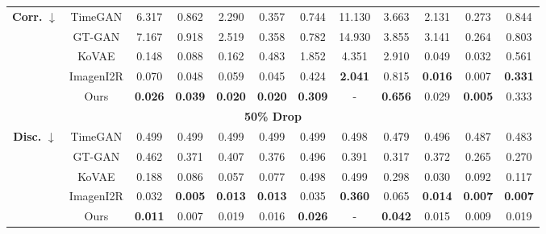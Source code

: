 \documentclass{article}
\theoremstyle{plain}
\theoremstyle{definition}
\theoremstyle{remark}
\begin{document}
\begin{table}[!t]
{\begin{tabular}{cc|cccccccccc}
    \multirow{5}{*}{\textbf{Corr.} $\downarrow$}
      & TimeGAN
         & 6.317
         & 0.862
         & 2.290
         & 0.357
         & 0.744
         & 11.130
         & 3.663
         & 2.131
         & 0.273
         & 0.844 \\
      & GT-GAN
         & 7.167
         & 0.918
         & 2.519
         & 0.358
         & 0.782
         & 14.930
         & 3.855
         & 3.141
         & 0.264
         & 0.803 \\
      & KoVAE
         & 0.148
         & 0.088
         & 0.162
         & 0.483
         & 1.852
         & 4.351
         & 2.910
         & 0.049
         & 0.032
         & 0.561 \\
      & ImagenI2R
         & 0.070
         & 0.048
         & 0.059
         & 0.045
         & 0.424
         & \textbf{2.041}
         & 0.815
         & \textbf{0.016}
         & 0.007
         & \textbf{0.331} \\
    & Ours
       & \textbf{0.026} & \textbf{0.039} & \textbf{0.020} & \textbf{0.020} & \textbf{0.309} & - & \textbf{0.656} & 0.029 & \textbf{0.005} & 0.333 \\
    \midrule

    \multicolumn{12}{c}{\textbf{50\% Drop}} \\[3pt]
    \midrule
    \multirow{5}{*}{\textbf{Disc.} $\downarrow$}
      & TimeGAN
         & 0.499
         & 0.499
         & 0.499
         & 0.499
         & 0.499
         & 0.498
         & 0.479
         & 0.496
         & 0.487
         & 0.483 \\
      & GT-GAN
         & 0.462
         & 0.371
         & 0.407
         & 0.376
         & 0.496
         & 0.391
         & 0.317
         & 0.372
         & 0.265
         & 0.270 \\
      & KoVAE
         & 0.188
         & 0.086
         & 0.057
         & 0.077
         & 0.498
         & 0.499
         & 0.298
         & 0.030
         & 0.092
         & 0.117 \\
      & ImagenI2R
         & 0.032
         & \textbf{0.005}
         & \textbf{0.013}
         & \textbf{0.013}
         & 0.035
         & \textbf{0.360}
         & 0.065
         & \textbf{0.014}
         & \textbf{0.007}
         & \textbf{0.007} \\
    & Ours
       & \textbf{0.011} & 0.007 & 0.019 & 0.016 & \textbf{0.026} & - & \textbf{0.042} & 0.015 & 0.009 & 0.019 \\
    \midrule


\end{tabular}}
\end{table}
\end{document}
